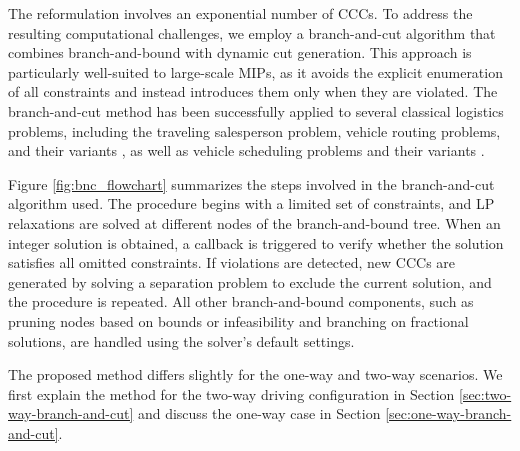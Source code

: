 \documentclass[10pt]{article}
\theoremstyle{definition}
\begin{document}
The reformulation involves an exponential number of CCCs. To address the resulting computational challenges, we employ a branch-and-cut algorithm that combines branch-and-bound with dynamic cut generation. This approach is particularly well-suited to large-scale MIPs, as it avoids the explicit enumeration of all constraints and instead introduces them only when they are violated. The branch-and-cut method has been successfully applied to several classical logistics problems, including the traveling salesperson problem, vehicle routing problems, and their variants \citep{padberg1991, lysgaard2004, ascheuer2001, tamke2021}, as well as vehicle scheduling problems and their variants \citep{hadjar2006, chai2024}.


Figure \ref{fig:bnc_flowchart} summarizes the steps involved in the branch-and-cut algorithm used. The procedure begins with a limited set of constraints, and LP relaxations are solved at different nodes of the branch-and-bound tree. When an integer solution is obtained, a callback is triggered to verify whether the solution satisfies all omitted constraints. If violations are detected, new CCCs are generated by solving a separation problem to exclude the current solution, and the procedure is repeated. All other branch-and-bound components, such as pruning nodes based on bounds or infeasibility and branching on fractional solutions, are handled using the solver’s default settings.

The proposed method differs slightly for the one-way and two-way scenarios. We first explain the method for the two-way driving configuration in Section  \ref{sec:two-way-branch-and-cut} and discuss the one-way case in Section \ref{sec:one-way-branch-and-cut}.
\end{document}
